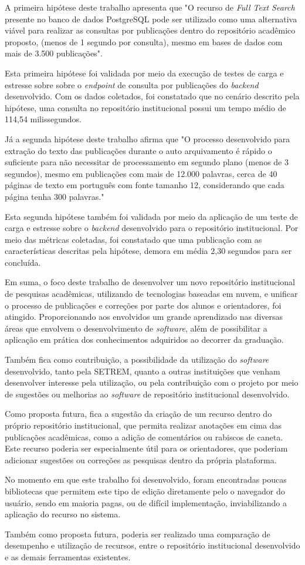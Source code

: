 A primeira hipótese deste trabalho apresenta que "O recurso de \emph{Full Text Search} presente
no banco de dados PostgreSQL pode ser utilizado como uma alternativa viável para realizar
as consultas por publicações dentro do repositório acadêmico proposto, (menos de 1 segundo
por consulta), mesmo em bases de dados com mais de 3.500 publicações".

Esta primeira hipótese foi validada por meio da execução de testes de carga e estresse
sobre sobre o \emph{endpoint} de consulta por publicações do \emph{backend} desenvolvido.
Com os dados coletados, foi constatado que no cenário descrito pela hipótese, uma consulta
no repositório institucional possui um tempo médio de 114,54 milissegundos.

Já a segunda hipótese deste trabalho afirma que "O processo desenvolvido para extração do
texto das publicações durante o auto arquivamento é rápido o suficiente para não necessitar
de processamento em segundo plano (menos de 3 segundos), mesmo em publicações com mais de
12.000 palavras, cerca de 40 páginas de texto em português com fonte tamanho 12,
considerando que cada página tenha 300 palavras."

Esta segunda hipótese também foi validada por meio da aplicação de um teste de carga
e estresse sobre o \emph{backend} desenvolvido para o repositório institucional. Por meio
das métricas coletadas, foi constatado que uma publicação com as características
descritas pela hipótese, demora em média 2,30 segundos para ser concluída.

Em suma, o foco deste trabalho de desenvolver um novo repositório institucional
de pesquisas acadêmicas, utilizando de tecnologias baseadas em nuvem, e unificar
o processo de publicações e correções por parte dos alunos e orientadores, foi atingido.
Proporcionando aos envolvidos um grande aprendizado nas diversas áreas que envolvem
o desenvolvimento de \emph{software}, além de possibilitar a aplicação em prática dos
conhecimentos adquiridos ao decorrer da graduação.

Também fica como contribuição, a possibilidade da utilização do \emph{software}
desenvolvido, tanto pela SETREM, quanto a outras instituições que venham desenvolver
interesse pela utilização, ou pela contribuição com o projeto por meio de sugestões
ou melhorias ao \emph{software} de repositório institucional desenvolvido.

Como proposta futura, fica a sugestão da criação de um recurso dentro do próprio
repositório institucional, que permita realizar anotações em cima das publicações
acadêmicas, como a adição de comentários ou rabiscos de caneta. Este recurso poderia
ser especialmente útil para os orientadores, que poderiam adicionar sugestões ou
correções as pesquisas dentro da própria plataforma.

No momento em que este trabalho
foi desenvolvido, foram encontradas poucas bibliotecas que permitem este tipo de
edição diretamente pelo o navegador do usuário, sendo em maioria pagas, ou de difícil
implementação, inviabilizando a aplicação do recurso no sistema.

Também como proposta futura, poderia ser realizado uma comparação de desempenho
e utilização de recursos, entre o repositório institucional desenvolvido e as demais
ferramentas existentes.